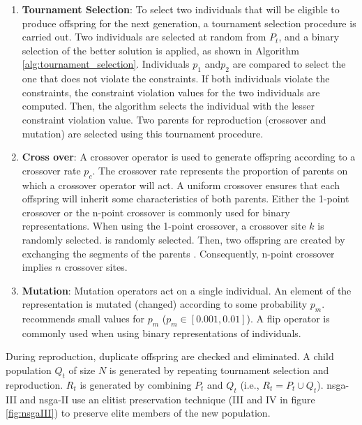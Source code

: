 \begin{enumerate}
    \item \textbf{Tournament Selection}: To select two individuals that will be eligible to produce offspring for the next generation, a tournament selection procedure is carried out. Two individuals are selected at random from $P_t$, and a binary selection of the better solution is applied, as shown in Algorithm  \ref{alg:tournament_selection}. Individuals $p_1$ and$p_2$ are compared to select the one that does not violate the constraints. If both individuals violate the constraints, the constraint violation values for the two individuals are computed. Then, the algorithm selects the individual with the lesser constraint violation value. Two parents for reproduction (crossover and mutation) are selected using this tournament procedure.
    \item \textbf{Cross over}: A crossover operator is used to generate offspring according to a crossover rate $p_c$. The crossover rate represents the proportion of parents on which a crossover operator will act. A uniform crossover ensures that each offspring will inherit some characteristics of both parents. Either the 1-point crossover or the n-point crossover is commonly used for binary representations. When using the 1-point crossover, a crossover site $k$ is randomly selected. is randomly selected. Then, two offspring are created by exchanging the segments of the parents \parencite{Talbi2009Metaheuristics:Implementation}. Consequently, n-point crossover implies $n$ crossover sites.
    \item \textbf{Mutation}: Mutation operators act on a single individual. An element of the representation is mutated (changed) according to some probability $p_m$. \parencite{Talbi2009Metaheuristics:Implementation} recommends small values for $p_m$ ($p_m \in [0.001, 0.01]$). A flip operator is commonly used when using binary representations of individuals. %
    
\end{enumerate}
During reproduction, duplicate offspring are checked and eliminated. A child population $Q_t$ of size $N$ is generated by repeating tournament selection and reproduction. $R_t$ is generated by combining $P_t$ and $Q_t$ (i.e., $R_t = P_t \cup Q_t$). \Gls{nsga}-III and \gls{nsga}-II use an elitist preservation technique (III and IV in figure \ref{fig:nsgaIII}) to preserve elite members of the new population.


